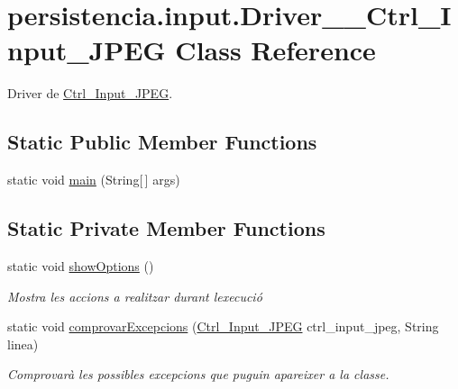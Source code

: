 \hypertarget{classpersistencia_1_1input_1_1Driver____Ctrl__Input__JPEG}{}\section{persistencia.\+input.\+Driver\+\_\+\+\_\+\+Ctrl\+\_\+\+Input\+\_\+\+J\+P\+EG Class Reference}
\label{classpersistencia_1_1input_1_1Driver____Ctrl__Input__JPEG}


Driver de \hyperlink{classpersistencia_1_1input_1_1Ctrl__Input__JPEG}{Ctrl\+\_\+\+Input\+\_\+\+J\+P\+EG}.  


\subsection*{Static Public Member Functions}
\begin{DoxyCompactItemize}
\item 
static void \hyperlink{classpersistencia_1_1input_1_1Driver____Ctrl__Input__JPEG_ae46ec7babdaa3cf25854b21c693c4165}{main} (String\mbox{[}$\,$\mbox{]} args)
\end{DoxyCompactItemize}
\subsection*{Static Private Member Functions}
\begin{DoxyCompactItemize}
\item 
static void \hyperlink{classpersistencia_1_1input_1_1Driver____Ctrl__Input__JPEG_a3ffde336b648d23ae0a517210d0f8f38}{show\+Options} ()
\begin{DoxyCompactList}\small\item\em Mostra les accions a realitzar durant l\textquotesingle{}execució \end{DoxyCompactList}\item 
static void \hyperlink{classpersistencia_1_1input_1_1Driver____Ctrl__Input__JPEG_ad40099d3188e58f93a2a57c4277b754e}{comprovar\+Excepcions} (\hyperlink{classpersistencia_1_1input_1_1Ctrl__Input__JPEG}{Ctrl\+\_\+\+Input\+\_\+\+J\+P\+EG} ctrl\+\_\+input\+\_\+jpeg, String linea)
\begin{DoxyCompactList}\small\item\em Comprovarà les possibles excepcions que puguin apareixer a la classe. \end{DoxyCompactList}\end{DoxyCompactItemize}


